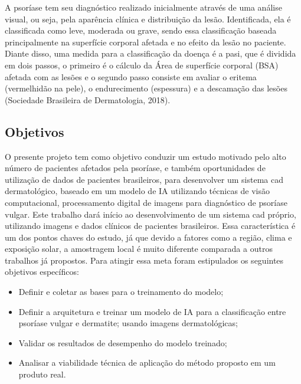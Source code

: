 
A psoríase tem seu diagnóstico realizado inicialmente através de uma análise visual, ou seja, pela aparência clínica e distribuição da lesão. Identificada, ela é classificada como leve, moderada ou grave, sendo essa classificação baseada principalmente na superfície corporal afetada e no efeito da lesão no paciente. Diante disso, uma medida para a classificação da doença é a \gls{pasi}, que é dividida em dois passos, o primeiro é o cálculo da Área de superfície corporal (BSA) afetada com as lesões e o segundo passo consiste em avaliar o eritema (vermelhidão na pele), o endurecimento (espessura) e a descamação das lesões (Sociedade Brasileira de Dermatologia, 2018).

\subsection{Objetivos}
O presente projeto tem como objetivo conduzir um estudo motivado pelo alto número de pacientes afetados pela psoríase, e também oportunidades de utilização de dados de pacientes brasileiros, para desenvolver um sistema \gls{cad} dermatológico, baseado em um modelo de \acs{IA} utilizando técnicas de visão computacional, processamento digital de imagens para diagnóstico de psoríase vulgar. Este trabalho dará início ao desenvolvimento de um sistema \gls{cad} próprio,  utilizando imagens e dados clínicos de pacientes brasileiros. Essa característica é um dos pontos chaves do estudo, já que devido a fatores como a região, clima e exposição solar, a amostragem local é muito diferente comparada a outros trabalhos já propostos. Para atingir essa meta foram estipulados os seguintes objetivos específicos:
\begin{itemize}
  \item Definir e coletar as bases para o treinamento do modelo;
  \item Definir a arquitetura e treinar um modelo de \acs{IA} para a classificação entre psoríase vulgar e dermatite; usando imagens dermatológicas;
  \item Validar os resultados de desempenho do modelo treinado;
  \item Analisar a viabilidade técnica de aplicação do método proposto em um produto real.

\end{itemize}
